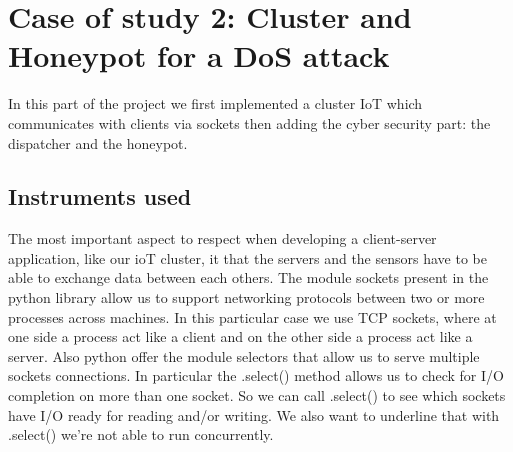 \section{Case of study 2: Cluster and Honeypot for a DoS attack}

In this part of the project  we first implemented a cluster IoT which communicates with clients via sockets then adding the cyber security part: the dispatcher and the honeypot.

\subsection{Instruments used}
 The most important aspect to respect when developing a client-server application, like our ioT cluster, it that the servers and the sensors have to be able to exchange data 
between each others. The module sockets present in  the python library allow us to support networking protocols between two or more processes across machines. In this particular case we use TCP sockets, where at one side a process act like a client and on the other side a process act like a server. Also python offer the module selectors that allow us to serve multiple sockets connections. In particular the .select() method allows us to check for I/O completion on more than one socket. So we can call .select() to see which sockets have I/O ready for reading and/or writing.  We also want to underline that with .select()  we’re not able to run concurrently. 


